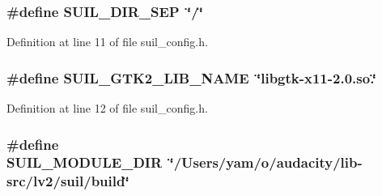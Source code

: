 \subsubsection[{\texorpdfstring{S\+U\+I\+L\+\_\+\+D\+I\+R\+\_\+\+S\+EP}{SUIL_DIR_SEP}}]{\setlength{\rightskip}{0pt plus 5cm}\#define S\+U\+I\+L\+\_\+\+D\+I\+R\+\_\+\+S\+EP~\char`\"{}/\char`\"{}}\hypertarget{mac_2config_2i386_2lib-src_2lv2_2sratom_2suil__config_8h_a849cee5f74c808afbcbb5160a706d9d0}{}\label{mac_2config_2i386_2lib-src_2lv2_2sratom_2suil__config_8h_a849cee5f74c808afbcbb5160a706d9d0}


Definition at line 11 of file suil\+\_\+config.\+h.

\subsubsection[{\texorpdfstring{S\+U\+I\+L\+\_\+\+G\+T\+K2\+\_\+\+L\+I\+B\+\_\+\+N\+A\+ME}{SUIL_GTK2_LIB_NAME}}]{\setlength{\rightskip}{0pt plus 5cm}\#define S\+U\+I\+L\+\_\+\+G\+T\+K2\+\_\+\+L\+I\+B\+\_\+\+N\+A\+ME~\char`\"{}libgtk-\/x11-\/2.\+0.so.\char`\"{}}\hypertarget{mac_2config_2i386_2lib-src_2lv2_2sratom_2suil__config_8h_a2a4a442c56d9c0a71a94c5394af58c69}{}\label{mac_2config_2i386_2lib-src_2lv2_2sratom_2suil__config_8h_a2a4a442c56d9c0a71a94c5394af58c69}


Definition at line 12 of file suil\+\_\+config.\+h.

\subsubsection[{\texorpdfstring{S\+U\+I\+L\+\_\+\+M\+O\+D\+U\+L\+E\+\_\+\+D\+IR}{SUIL_MODULE_DIR}}]{\setlength{\rightskip}{0pt plus 5cm}\#define S\+U\+I\+L\+\_\+\+M\+O\+D\+U\+L\+E\+\_\+\+D\+IR~\char`\"{}/Users/yam/o/audacity/lib-\/src/lv2/suil/build\char`\"{}}\hypertarget{mac_2config_2i386_2lib-src_2lv2_2sratom_2suil__config_8h_a6f34ba79b7d71e94a6dd042abc293619}{}\label{mac_2config_2i386_2lib-src_2lv2_2sratom_2suil__config_8h_a6f34ba79b7d71e94a6dd042abc293619}


